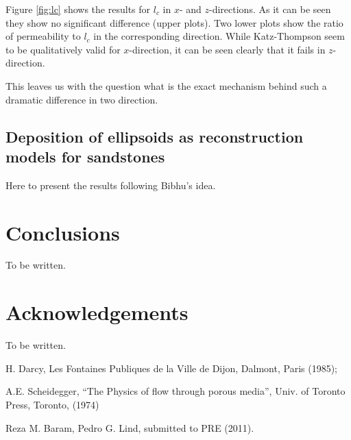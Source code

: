\documentclass[aps,twocolumn,superscriptaddress,showpacs,showkeys]{revtex4}
\begin{document}
Figure \ref{fig:lc} shows the results for $l_c$ in $x$- and $z$-directions. 
As it can be seen they show no significant difference (upper plots). Two lower plots 
show the ratio of permeability to $l_c$ in the corresponding direction.  While 
Katz-Thompson seem to be qualitatively valid for $x$-direction, it can be seen clearly that 
it fails in $z$-direction.

This leaves us with the question what is the exact mechanism behind such a dramatic difference in 
two direction.

\subsection{Deposition of ellipsoids as reconstruction models for sandstones}
\label{sec:sandstone}
Here to present the results following Bibhu's idea.

\section{Conclusions}
\label{sec:conclusions}
To be written.
\section*{Acknowledgements}
To be written.

\begin{thebibliography}{99}

 H. Darcy, Les Fontaines Publiques de la Ville de Dijon, Dalmont, Paris (1985);

 A.E. Scheidegger, ``The Physics of flow through porous media'', 
	Univ. of Toronto Press, Toronto, (1974)

 Reza M. Baram, Pedro G. Lind, submitted to PRE (2011).

\end{thebibliography}
\end{document}

